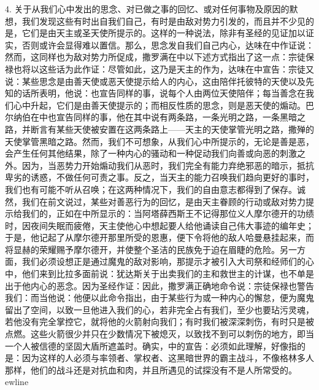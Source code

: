 4. 关于从我们心中发出的思念、对已做之事的回忆、或对任何事物及原因的默想，我们发现这些有时出自我们自己，有时是由敌对势力引发的，而且并不少见的是，它们是由天主或圣天使所提示的。这样的一种说法，除非有圣经的见证加以证实，否则或许会显得难以置信。那么，思念发自我们自己内心，达味在中作证说：然而，这同样也为敌对势力所促成，撒罗满在中以下述方式指出了这一点：宗徒保禄也将以这些话为此作证：尽管如此，这乃是天主的作为，达味在中宣告：宗徒又说：某些思念是由善天使或恶天使提示给人的内心，这由陪伴托彼特的天使以及先知的话所表明，他说：也宣告同样的事，说每个人由两位天使陪伴；每当善念在我们心中升起，它们是由善天使提示的；而相反性质的思念，则是恶天使的煽动。巴尔纳伯在中也宣告同样的事，他在其中说有两条路，一条光明之路，一条黑暗之路，并断言有某些天使被安置在这两条路上——天主的天使掌管光明之路，撒殚的天使掌管黑暗之路。然而，我们不可想象，从我们心中所提示的，无论是善是恶，会产生任何其他结果，除了一种内心的骚动和一种促动我们向善或向恶的刺激之外。因为，当恶势力开始煽动我们从恶时，我们完全有能力弃绝邪恶的暗示，抵抗卑劣的诱惑，不做任何可责之事。反之，当天主的能力召唤我们趋向更好的事时，我们也有可能不听从召唤；在这两种情况下，我们的自由意志都得到了保存。诚然，我们在前文说过，某些对善恶行为的回忆，是由天主眷顾的行动或敌对势力提示给我们的，正如在中所显示的：当阿塔薛西斯王不记得那位义人摩尔德开的功绩时，因夜间失眠而疲倦，天主使他心中想起要人给他诵读自己伟大事迹的编年史；于是，他记起了从摩尔德开那里所受的恩惠，便下令将他的敌人哈曼悬挂起来，而将显赫的荣耀赐予摩尔德开，并使整个圣洁的民族免于迫在眉睫的危险。另一方面，我们必须设想正是通过魔鬼的敌对影响，那提示才被引入大司祭和经师们的心中，他们来到比拉多面前说：犹达斯关于出卖我们的主和救世主的计谋，也不单是出于他内心的恶念。因为圣经作证：因此，撒罗满正确地命令说：宗徒保禄也警告我们：而当他说：他便以此命令指出，由于某些行为或一种内心的懈怠，便为魔鬼留出了空间，以致一旦他进入我们的心，若非完全占有我们，至少也要玷污灵魂，若他没有完全掌控它，就将他的火箭射向我们；有时我们被深深刺伤，有时只是被点燃。这些火箭很少并只在少数情况下被熄灭，以致找不到可以刺伤的地方，即当一个人被信德的坚固大盾所遮盖时。确实，中的宣告：必须如此理解，好像指的是：因为这样的人必须与率领者、掌权者、这黑暗世界的霸主战斗，不像格林多人那样，他们的战斗还是对抗血和肉，并且所遇见的试探没有不是人所常受的。\newline{}ewline{}\par

